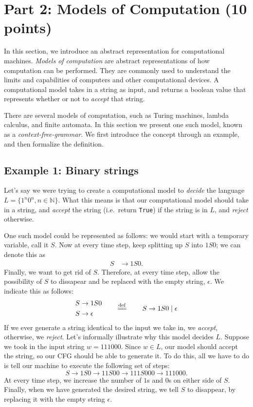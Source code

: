 \documentclass{article}
\begin{document}
\section*{Part 2: Models of Computation (10 points)}
    In this section, we introduce an abstract representation for computational machines. \textit{Models of computation} are abstract representations of how computation can be performed. They are commonly used to understand the limits and capabilities of computers and other computational devices. A computational model takes in a string as input, and returns a boolean value that represents whether or not to \textit{accept} that string.

    \vspace{3mm}
    There are several models of computation, such as Turing machines, lambda calculus, and finite automata. In this section we present one such model, known as a \textit{context-free-grammar}. We first introduce the concept through an example, and then formalize the definition.
    
\subsection*{Example 1: Binary strings}
    Let's say we were trying to create a computational model to \textit{decide} the language $L = \{1^{n}0^{n}, n \in \mathbb{N}\}$. What this means is that our computational model should take in a string, and \textit{accept} the string (i.e.\ return \texttt{True}) if the string is in $L$, and \textit{reject} otherwise.

    \vspace{2mm}
    One such model could be represented as follows: we would start with a temporary variable, call it $S$. Now at every time step, keep splitting up $S$ into $1S0$; we can denote this as
    \begin{align*}
        S &\rightarrow 1S0.
    \end{align*}
    Finally, we want to get rid of $S$. Therefore, at every time step, allow the possibility of $S$ to dissapear and be replaced with the empty string, $\epsilon$. We indicate this as follows:
    $$
    \begin{aligned}
        S &\rightarrow 1S0 \\
        S &\rightarrow \epsilon
    \end{aligned}
    \qquad \overset{\mathrm{def}}{=\joinrel=} \qquad S \rightarrow 1S0 \mid \epsilon
    $$
    If we ever generate a string identical to the input we take in, we \textit{accept}, otherwise, we \textit{reject}. Let's informally illustrate why this model decides $L$. Suppose we took in the input string $w = 111000$. Since $w \in L$, our model should accept the string, so our CFG should be able to generate it. To do this, all we have to do is tell our machine to execute the following set of steps:
    $$S \rightarrow 1S0 \rightarrow 11S00 \rightarrow 111S000 \rightarrow 111000.$$ At every time step, we increase the number of $1$s and $0$s on either side of $S$. Finally, when we have generated the desired string, we tell $S$ to disappear, by replacing it with the empty string $\epsilon$.
\end{document}

